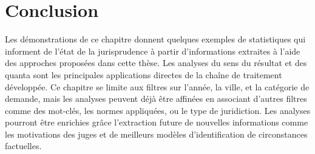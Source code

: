 \section{Conclusion}
\label{sec:demo:conclusion}
Les démonstrations de ce chapitre donnent quelques exemples de statistiques qui informent de l'état de la jurisprudence à partir d'informations extraites à l'aide des approches proposées dans cette thèse. Les analyses du sens du résultat et des quanta sont les principales applications directes de la chaîne de traitement développée. Ce chapitre se limite aux filtres sur l'année, la ville, et la catégorie de demande, mais les analyses peuvent déjà être affinées en associant d'autres filtres comme  des mot-clés, les normes appliquées, ou le type de juridiction. Les analyses pourront être enrichies grâce l'extraction future de nouvelles informations comme les motivations des juges et de meilleurs modèles d'identification de circonstances factuelles.